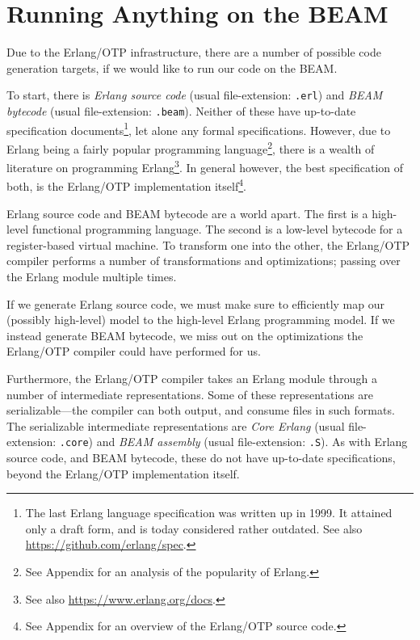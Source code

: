 \section{Running Anything on the BEAM}

Due to the Erlang/OTP infrastructure, there are a number of possible
code generation targets, if we would like to run our code on the BEAM.

To start, there is \emph{Erlang source code} (usual file-extension:
\texttt{.erl}) and \emph{BEAM bytecode} (usual file-extension:
\texttt{.beam}). Neither of these have up-to-date specification
documents\footnote{The last Erlang language specification was written
up in 1999\cite{erlang:1999:spec}. It attained only a draft form, and
is today considered rather outdated.  See also
\url{https://github.com/erlang/spec}.}, let alone any formal
specifications. However, due to Erlang being a fairly popular
programming language\footnote{See Appendix
 for an analysis of the popularity
of Erlang.}, there is a wealth of literature on programming
Erlang\footnote{See also \url{https://www.erlang.org/docs}.}.  In
general however, the best specification of both, is the Erlang/OTP
implementation itself\footnote{See Appendix
 for an overview of the
Erlang/OTP source code.}.

Erlang source code and BEAM bytecode are a world apart. The first is a
high-level functional programming language. The second is a low-level
bytecode for a register-based virtual machine. To transform one into
the other, the Erlang/OTP compiler performs a number of
transformations and optimizations; passing over the Erlang module
multiple times.

If we generate Erlang source code, we must make sure to efficiently
map our (possibly high-level) model to the high-level Erlang
programming model. If we instead generate BEAM bytecode, we miss out
on the optimizations the Erlang/OTP compiler could have performed for
us.

Furthermore, the Erlang/OTP compiler takes an Erlang module through a
number of intermediate representations. Some of these representations
are serializable---the compiler can both output, and consume files in
such formats. The serializable intermediate representations are
\emph{Core Erlang} (usual file-extension: \texttt{.core}) and
\emph{BEAM assembly} (usual file-extension: \texttt{.S}). As with
Erlang source code, and BEAM bytecode, these do not have up-to-date
specifications, beyond the Erlang/OTP implementation itself.

